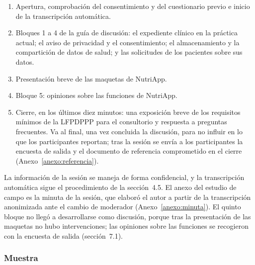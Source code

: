 \documentclass[12pt, a4paper]{article}
\begin{document}
\begin{enumerate}
  \item Apertura, comprobación del consentimiento y del cuestionario
    previo e inicio de la transcripción automática.
  \item Bloques 1 a 4 de la guía de discusión: el expediente clínico en
    la práctica actual; el aviso de privacidad y el consentimiento; el
    almacenamiento y la compartición de datos de salud; y las
    solicitudes de los pacientes sobre sus datos.
  \item Presentación breve de las maquetas de NutriApp.
  \item Bloque 5: opiniones sobre las funciones de NutriApp.
  \item Cierre, en los últimos diez minutos: una exposición breve de los
    requisitos mínimos de la LFPDPPP para el consultorio y respuesta a
    preguntas frecuentes. Va al final, una vez concluida la discusión,
    para no influir en lo que los participantes reportan; tras la
    sesión se envía a los participantes la encuesta de salida y el
    documento de referencia comprometido en el cierre
    (Anexo~\ref{anexo:referencia}).
\end{enumerate}
 
La información de la sesión se maneja de forma confidencial, y la
transcripción automática sigue el procedimiento de la sección~4.5. El
anexo del estudio de campo es la minuta de la sesión, que elaboró el
autor a partir de la transcripción anonimizada ante el cambio de
moderador (Anexo~\ref{anexo:minuta}). El quinto bloque no llegó a
desarrollarse como discusión, porque tras la presentación de las
maquetas no hubo intervenciones; las opiniones sobre las funciones se
recogieron con la encuesta de salida (sección~7.1).
 
\subsubsection{Muestra}
 
\end{document}
